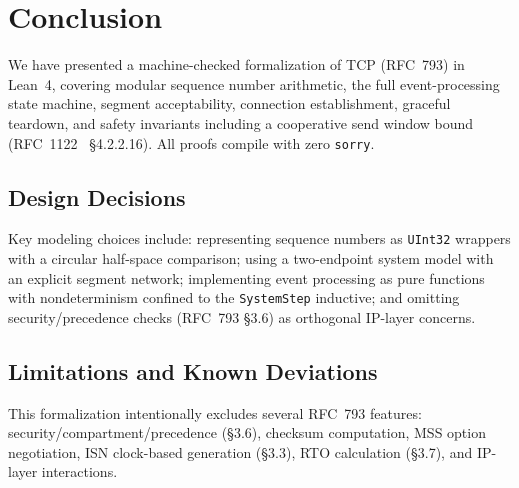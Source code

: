 \documentclass[11pt]{article}
\theoremstyle{definition}
\begin{document}
\section{Conclusion}
\label{sec:conclusion}

We have presented a machine-checked formalization of TCP (RFC~793) in Lean~4,
covering modular sequence number arithmetic, the full event-processing state
machine, segment acceptability, connection establishment, graceful teardown,
and safety invariants including a cooperative send window bound (RFC~1122~\cite{rfc1122}
\S4.2.2.16). All proofs compile with zero \texttt{sorry}.

\subsection{Design Decisions}

Key modeling choices include: representing sequence numbers as \texttt{UInt32}
wrappers with a circular half-space comparison; using a two-endpoint system
model with an explicit segment network; implementing event processing as pure
functions with nondeterminism confined to the \texttt{SystemStep} inductive;
and omitting security/precedence checks (RFC~793 \S3.6) as orthogonal
IP-layer concerns.

\subsection{Limitations and Known Deviations}

This formalization intentionally excludes several RFC~793 features:
security/compartment/precedence (\S3.6), checksum computation, MSS option
negotiation, ISN clock-based generation (\S3.3), RTO calculation (\S3.7),
and IP-layer interactions.
\end{document}
